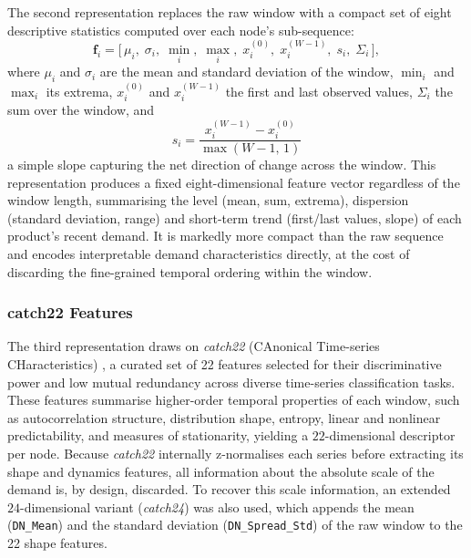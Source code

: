 The second representation replaces the raw window with a compact set of eight
descriptive statistics computed over each node's sub-sequence:
\[
\mathbf{f}_i = \big[\,\mu_i,\; \sigma_i,\; \min_i,\; \max_i,\; x_i^{(0)},\;
x_i^{(W-1)},\; s_i,\; \Sigma_i \,\big],
\]
where $\mu_i$ and $\sigma_i$ are the mean and standard deviation of the window,
$\min_i$ and $\max_i$ its extrema, $x_i^{(0)}$ and $x_i^{(W-1)}$ the first and
last observed values, $\Sigma_i$ the sum over the window, and
\[
s_i = \frac{x_i^{(W-1)} - x_i^{(0)}}{\max(W-1,\,1)}
\]
a simple slope capturing the net direction of change across the window. This
representation produces a fixed eight-dimensional feature vector regardless of
the window length, summarising the level (mean, sum, extrema), dispersion
(standard deviation, range) and short-term trend (first/last values, slope) of
each product's recent demand. It is markedly more compact than the raw
sequence and encodes interpretable demand characteristics directly, at the cost
of discarding the fine-grained temporal ordering within the window.

\subsubsection{catch22 Features}

The third representation draws on \textit{catch22} (CAnonical Time-series
CHaracteristics) \cite{lubba2019catch22canonicaltimeseriescharacteristics}, a curated set of 22 features selected for their
discriminative power and low mutual redundancy across diverse time-series
classification tasks. These features summarise higher-order temporal properties
of each window, such as autocorrelation structure, distribution shape,
entropy, linear and nonlinear predictability, and measures of stationarity,
yielding a $22$-dimensional descriptor per node. Because \textit{catch22}
internally z-normalises each series before extracting its shape and dynamics
features, all information about the absolute scale of the demand is, by design,
discarded. To recover this scale information, an extended $24$-dimensional
variant (\textit{catch24}) was also used, which appends the mean
(\texttt{DN\_Mean}) and the standard deviation (\texttt{DN\_Spread\_Std}) of
the raw window to the 22 shape features.


